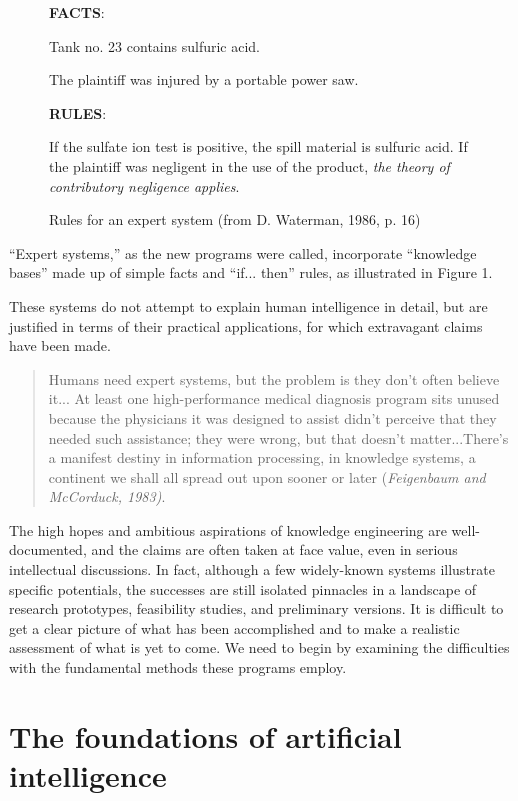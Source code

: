 \documentclass[12pt]{article}
\begin{document}
\newpage

\begin{figure}
{\bf FACTS}:

\medskip
\noindent
Tank no. 23 contains sulfuric acid.

\noindent
The plaintiff was injured by a portable power saw.

\medskip

{\bf RULES}:

\medskip
\noindent
If the sulfate ion test is positive, the spill material is sulfuric acid. If the plaintiff was negligent in the use of the product, {\it the theory of contributory negligence applies}.

\caption{Rules for an expert system (from D. Waterman, 1986, p. 16)}
\end{figure}

\goodbreak

``Expert systems,'' as the new programs were called, incorporate ``knowledge bases'' made up of simple facts and ``if... then'' rules, as illustrated in Figure 1.

These systems do not attempt to explain human intelligence in detail, but are justified in terms of their practical applications, for which extravagant claims have been made.

\begin{quote}
Humans need expert systems, but the problem is they don’t often believe it... At least one high-performance medical diagnosis program sits unused because the physicians it was designed to assist didn’t perceive that they needed such assistance; they were wrong, but that doesn’t matter...There’s a manifest destiny in information processing, in knowledge systems, a continent we shall all spread out upon sooner or later ({\it Feigenbaum and McCorduck, 1983)}.
\end{quote}

The high hopes and ambitious aspirations of knowledge engineering are well-documented, and the claims are often taken at face value, even in serious intellectual discussions. In fact, although a few widely-known systems illustrate specific potentials, the successes are still isolated pinnacles in a landscape of research prototypes, feasibility studies, and preliminary versions. It is difficult to get a clear picture of what has been accomplished and to make a realistic assessment of what is yet to come. We need to begin by examining the difficulties with the fundamental methods these programs employ.

\section{The foundations of artificial intelligence}
\end{document}
